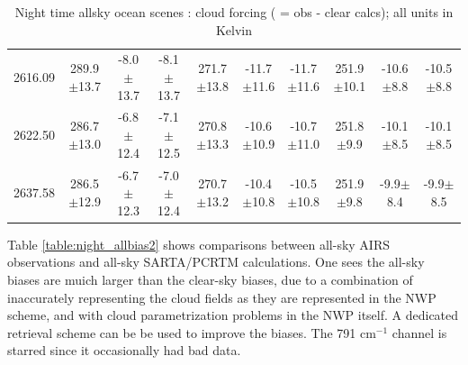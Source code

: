 \documentclass[agupp]{aguplus}              %
\newcommand{\wn}{cm$^{-1}$\xspace}
\begin{document}
\begin{article}
\begin{center}
\begin{table}[ht]
{\begin{tabular}{c|ccc|ccc|ccc}
2616.09 & 289.9$\pm$13.7 & -8.0$\pm$13.7 & -8.1$\pm$13.7 & 271.7$\pm$13.8 & -11.7$\pm$11.6 & -11.7$\pm$11.6 & 251.9$\pm$10.1 & -10.6$\pm$8.8 & -10.5$\pm$8.8 \\ 
2622.50 & 286.7$\pm$13.0 & -6.8$\pm$12.4 & -7.1$\pm$12.5 & 270.8$\pm$13.3 & -10.6$\pm$10.9 & -10.7$\pm$11.0 & 251.8$\pm$9.9 & -10.1$\pm$8.5 & -10.1$\pm$8.5 \\ 
2637.58 & 286.5$\pm$12.9 & -6.7$\pm$12.3 & -7.0$\pm$12.4 & 270.7$\pm$13.2 & -10.4$\pm$10.8 & -10.5$\pm$10.8 & 251.9$\pm$9.8 & -9.9$\pm$8.4 & -9.9$\pm$8.5 \\ 
\hline
\end{tabular}}
\hfill{}
\caption{Night time allsky ocean scenes : cloud forcing ( = obs - clear calcs); all units in Kelvin}
\label{table:night_all2} %
\end{table}
\end{center}


Table \ref{table:night_allbias2} shows comparisons between all-sky
AIRS observations and all-sky SARTA/PCRTM calculations. One sees the
all-sky biases are muich larger than the clear-sky biases, due to a
combination of inaccurately representing the cloud fields as they are
represented in the NWP scheme, and with cloud parametrization problems
in the NWP itself. A dedicated retrieval scheme can be be used to
improve the biases. The 791 \wn channel is starred since it
occasionally had bad data.


\end{article}
\end{document}
